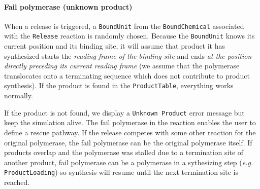 \paragraph{Fail polymerase (unknown product)} When a release is triggered, a \texttt{BoundUnit} from the \texttt{BoundChemical} associated with the \texttt{Release} reaction is randomly chosen. Because the \texttt{BoundUnit} knows its current position and its binding site, it will assume that product it has synthesized starts the \emph{reading frame of the binding site} and ends \emph{at the position directly preceding its current reading frame} (we assume that the polymerase translocates onto a terminating sequence which does not contribute to product synthesis). If the product is found in the \texttt{ProductTable}, everything works normally. 

If the product is not found, we display a \texttt{Unknown Product} error message but keep the simulation alive. The fail polymerase in the reaction enables the user to define a rescue pathway. If the release competes with some other reaction for the original polymerase, the fail polymerase can be the original polymerase itself. If products overlap and the polymerase was stalled due to a termination site of another product, fail polymerase can be a polymerase in a sythesizing step (\textit{e.g.} \texttt{ProductLoading}) so synthesis will resume until the next termination site is reached.
